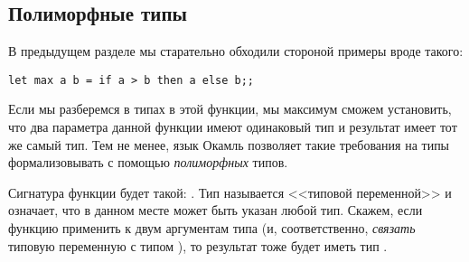 \subsection{Полиморфные типы}

В предыдущем разделе мы старательно обходили стороной примеры вроде
такого:

\begin{verbatim}
let max a b = if a > b then a else b;;
\end{verbatim}

Если мы разберемся в типах в этой функции, мы максимум сможем
установить, что два параметра данной функции имеют одинаковый тип и 
результат имеет тот же самый тип. Тем не менее, язык Окамль позволяет
такие требования на типы формализовывать с помощью \emph{полиморфных}
типов.

Сигнатура функции  будет такой: . 
Тип  называется <<типовой переменной>> и означает, что в данном
месте может быть указан любой тип. Скажем, если функцию  применить
к двум аргументам типа  (и, соответственно, \emph{связать}
типовую переменную  с типом ), то результат тоже будет
иметь тип .

